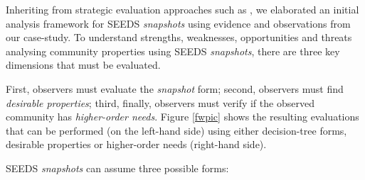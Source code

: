 Inheriting from strategic evaluation approaches such as \cite{swot}, we elaborated an initial analysis framework for SEEDS \emph{snapshots} using evidence and observations from our case-study. To understand strengths, weaknesses, opportunities and threats analysing community properties using SEEDS \emph{snapshots}, there are three key dimensions that must be evaluated.

First, observers must evaluate the \emph{snapshot} form; second, observers must find \emph{desirable properties}; third, finally, observers must verify if the observed community has \emph{higher-order needs}. Figure \ref{fwpic} shows the resulting evaluations that can be performed (on the left-hand side) using either decision-tree forms, desirable properties or higher-order needs (right-hand side).

SEEDS \emph{snapshots} can assume three possible forms:

